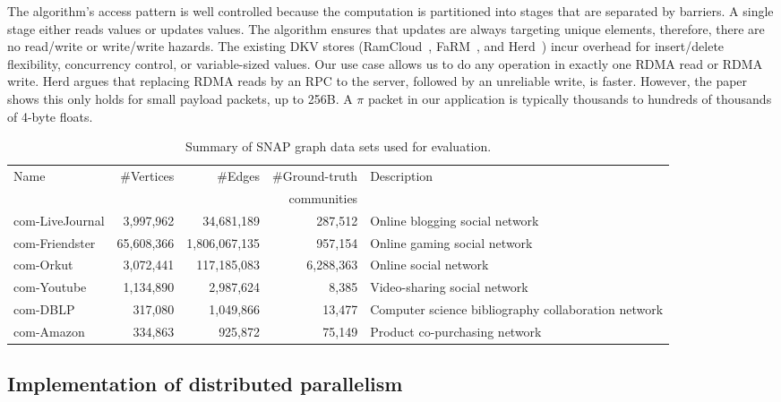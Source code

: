 The algorithm's access pattern is well controlled because the
computation is partitioned into stages that are separated by barriers. A
single stage either reads values or updates values. The algorithm ensures that updates
are always targeting unique elements,
therefore, there are no read/write or write/write hazards. The existing DKV
stores (RamCloud~\cite{Ousterhout:2015:RSS:2818727.2806887}, FaRM~\cite{179767},
and Herd~\cite{Kalia:2014:URE:2740070.2626299}) incur
overhead for insert/delete flexibility, concurrency control, or variable-sized
values. Our use case allows us to do any operation in exactly one RDMA read
or RDMA write.
%
Herd argues that replacing RDMA reads by
an RPC to the server, followed by an unreliable write, is faster.
%
However,
the paper shows this only holds for small payload packets, up to 256B. A $\pi$
packet in our application is typically thousands to hundreds of thousands
of 4-byte floats.

\begin{table*}
  \centering
  \begin{tabular}{l r r r l}
    Name            & \#Vertices &       \#Edges & \#Ground-truth & Description \\
                    &            &               & communities    &             \\
    \hline
    com-LiveJournal &  3,997,962 &    34,681,189 & 287,512        & Online blogging social network \\
    com-Friendster  & 65,608,366 & 1,806,067,135 & 957,154        & Online gaming social network \\
    com-Orkut       &  3,072,441 &   117,185,083 & 6,288,363      & Online social network \\
    com-Youtube     &  1,134,890 &     2,987,624 & 8,385          & Video-sharing social network \\
    com-DBLP        &    317,080 &     1,049,866 & 13,477         & Computer science bibliography collaboration network \\
    com-Amazon      &    334,863 &       925,872 & 75,149         & Product co-purchasing network \\
    \hline
  \end{tabular}
  \caption{Summary of SNAP graph data sets used for evaluation.}
  \label{tab-datasets}
\end{table*}


\subsection{Implementation of distributed parallelism}

